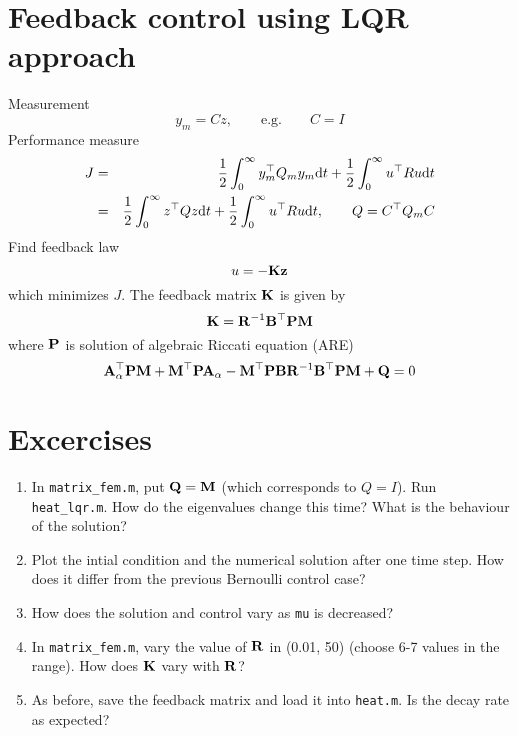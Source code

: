 \documentclass[12pt]{article}
\begin{document}

\section{Feedback control using LQR approach}
Measurement
\[
y_m = C z, \qquad \textrm{e.g.} \qquad C = I
\]
Performance measure
\begin{eqnarray*}
J &=& \frac{1}{2}\int_0^\infty y_m^\top Q_m y_m \textrm{d} t + \frac{1}{2} \int_0^\infty u^\top R 
u \textrm{d} t \\
&=& \frac{1}{2}\int_0^\infty z^\top Q z \textrm{d} t + \frac{1}{2} \int_0^\infty u^\top R u \textrm{d}   
t , \qquad Q = C^\top Q_m C
\end{eqnarray*}
Find feedback law
\[
u = -{\mathbf K} {\mathbf z}
\]
which minimizes $J$. The feedback matrix ${\mathbf K}$ is given by
\[
{\mathbf K} = {\mathbf R}^{-1} {\mathbf B}^\top {\mathbf P} {\mathbf M}
\]
where ${\mathbf P}$ is solution of algebraic Riccati equation (ARE)
\[
{\mathbf A}^\top_\alpha {\mathbf P} {\mathbf M} + {\mathbf M}^\top {\mathbf P} {\mathbf A}_\alpha - {\mathbf M}^\top {\mathbf P} {\mathbf B} {\mathbf R}^{-1} {\mathbf B}^\top {\mathbf P} {\mathbf M} + {\mathbf Q} = 0
\]

\section{Excercises}

\begin{enumerate}

\item In {\tt matrix\_fem.m}, put ${\mathbf Q} = {\mathbf M}$ (which corresponds to $Q = I$). Run {\tt heat\_lqr.m}. How do the eigenvalues change this time? What is the behaviour of the solution?

\item Plot the intial condition and the numerical solution after one time step. How does it differ from the previous Bernoulli control case?

\item How does the solution and control vary as {\tt mu} is decreased?

\item In {\tt matrix\_fem.m}, vary the value of ${\mathbf R}$ in (0.01, 50) (choose 6-7 values in the range). How does ${\mathbf K}$ vary with ${\mathbf R}$?

\item As before, save the feedback matrix and load it into {\tt heat.m}. Is the decay rate as expected?
\end{enumerate}
\end{document}
